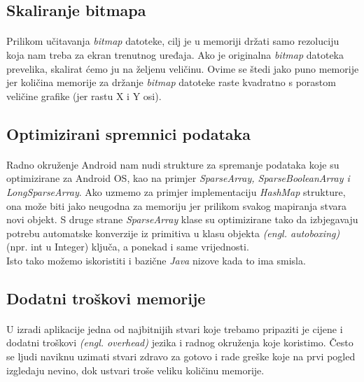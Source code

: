 \documentclass[times, utf8, zavrsni]{fer}
\begin{document}
\subsection{Skaliranje bitmapa}
\paragraph{}
Prilikom učitavanja \textit{bitmap} datoteke, cilj je u memoriji držati samo rezoluciju koja nam treba za ekran trenutnog uređaja. Ako je originalna \textit{bitmap} datoteka prevelika, skalirat ćemo ju na željenu veličinu. Ovime se štedi jako puno memorije jer količina memorije za držanje \textit{bitmap} datoteke raste kvadratno s porastom veličine grafike (jer rastu X i Y osi).

\subsection{Optimizirani spremnici podataka}
\paragraph{}
Radno okruženje Android nam nudi strukture za spremanje podataka koje su optimizirane za Android OS, kao na primjer \textit{SparseArray, SparseBooleanArray i LongSparseArray}. Ako uzmemo za primjer implementaciju \textit{HashMap} strukture, ona može biti jako neugodna za memoriju jer prilikom svakog mapiranja stvara novi objekt. S druge strane \textit{SparseArray} klase su optimizirane tako da izbjegavaju potrebu automatske konverzije iz primitiva u klasu objekta \textit{(engl. autoboxing)}(npr. int u Integer) ključa, a ponekad i same vrijednosti.\\

Isto tako možemo iskoristiti i bazične \textit{Java} nizove kada to ima smisla.

\subsection{Dodatni troškovi memorije}
\paragraph{}
U izradi aplikacije jedna od najbitnijih stvari koje trebamo pripaziti je cijene i dodatni troškovi \textit{(engl. overhead)} jezika i radnog okruženja koje koristimo. Često se ljudi naviknu uzimati stvari zdravo za gotovo i rade greške koje na prvi pogled izgledaju nevino, dok ustvari troše veliku količinu memorije.
\end{document}
